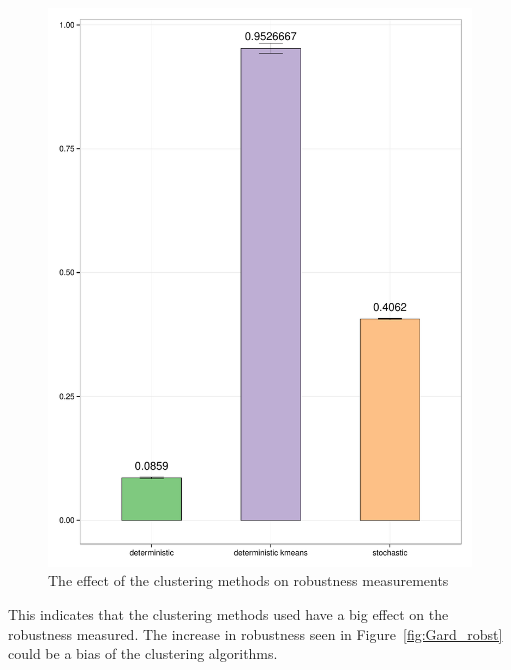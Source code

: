 \begin{figure}[h]
\centering
\includegraphics[scale=0.5]{chapterModelling/images/Gardner/robustness_comparison_gard_stoch_determ_kmeans.pdf}
\caption{The effect of the clustering methods on robustness measurements}
\label{fig:Gard_det_stoch_kmeans}
\end{figure}

This indicates that the clustering methods used have a big effect on the robustness measured. The increase in robustness seen in Figure~\ref{fig:Gard_robst} could be a bias of the clustering algorithms.
\clearpage
